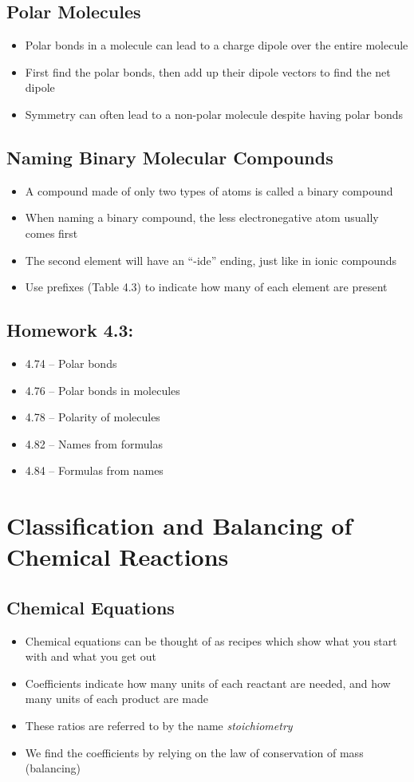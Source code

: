 \documentclass[12pt, openany, letterpaper]{memoir}
\begin{document}
\section{Polar Molecules}
\begin{itemize}
	\item Polar bonds in a molecule can lead to a charge dipole over the entire molecule
	\item First find the polar bonds, then add up their dipole vectors to find the net dipole
	\item Symmetry can often lead to a non-polar molecule despite having polar bonds
\end{itemize}

\section{Naming Binary Molecular Compounds}
\begin{itemize}
	\item A compound made of only two types of atoms is called a binary compound
	\item When naming a binary compound, the less electronegative atom usually comes first
	\item The second element will have an ``-ide'' ending, just like in ionic compounds
	\item Use prefixes (Table 4.3) to indicate how many of each element are present
\end{itemize}

\section*{Homework 4.3:}
\begin{itemize}
	\item 4.74 -- Polar bonds
	\item 4.76 -- Polar bonds in molecules
	\item 4.78 -- Polarity of molecules
	\item 4.82 -- Names from formulas
	\item 4.84 -- Formulas from names
\end{itemize}

\chapter{Classification and Balancing of Chemical Reactions}
\section{Chemical Equations}
\begin{itemize}
	\item Chemical equations can be thought of as recipes which show what you start with and what you get out
	\item Coefficients indicate how many units of each reactant are needed, and how many units of each product are made
	\item These ratios are referred to by the name \emph{stoichiometry}
	\item We find the coefficients by relying on the law of conservation of mass (balancing)
\end{itemize}
\end{document}
